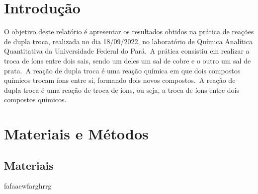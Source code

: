 \documentclass[a4paper, 11pt]{article}
\begin{document}
\newpage
\section{Introdução}\label{sec:intro}
\indent O objetivo deste relatório é apresentar os resultados obtidos na prática de reações de dupla troca, realizada no dia 18/09/2022, no laboratório de Química Analítica Quantitativa da Universidade Federal do Pará.\  A prática consistiu em realizar a troca de íons entre dois sais, sendo um deles um sal de cobre e o outro um sal de prata.\ A reação de dupla troca é uma reação química em que dois compostos químicos trocam íons entre si, formando dois novos compostos.\ A reação de dupla troca é uma reação de troca de íons, ou seja, a troca de íons entre dois compostos químicos.


\section{Materiais e Métodos}\label{sec:mat}
\subsection{Materiais}\label{sec:mat:mat}
    \indent fafaaewfarghrrg
\end{document}
